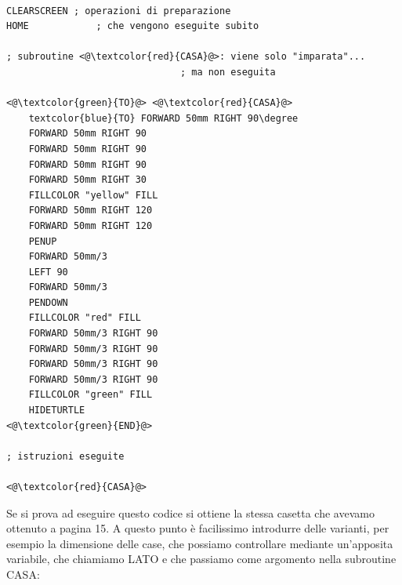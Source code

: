\lstset{extendedchars=true, basicstyle=\scriptsize}
\begin{lstlisting}[frame=single]  % Start your code-block

CLEARSCREEN	; operazioni di preparazione
HOME			; che vengono eseguite subito

; subroutine <@\textcolor{red}{CASA}@>: viene solo "imparata"...
                               ; ma non eseguita 

<@\textcolor{green}{TO}@> <@\textcolor{red}{CASA}@>
	textcolor{blue}{TO} FORWARD 50mm RIGHT 90\degree
	FORWARD 50mm RIGHT 90
	FORWARD 50mm RIGHT 90
	FORWARD 50mm RIGHT 90
	FORWARD 50mm RIGHT 30
	FILLCOLOR "yellow" FILL
	FORWARD 50mm RIGHT 120
	FORWARD 50mm RIGHT 120
	PENUP
	FORWARD 50mm/3
	LEFT 90
	FORWARD 50mm/3
	PENDOWN
	FILLCOLOR "red" FILL
	FORWARD 50mm/3 RIGHT 90
	FORWARD 50mm/3 RIGHT 90
	FORWARD 50mm/3 RIGHT 90
	FORWARD 50mm/3 RIGHT 90
	FILLCOLOR "green" FILL
	HIDETURTLE
<@\textcolor{green}{END}@>

; istruzioni eseguite

<@\textcolor{red}{CASA}@>

\end{lstlisting}

\vskip 1cm

Se si prova ad eseguire questo codice si ottiene la stessa casetta che avevamo ottenuto a pagina 15. A questo punto è facilissimo introdurre delle varianti, per esempio la dimensione delle case, che possiamo controllare mediante un'apposita variabile, che chiamiamo LATO e che passiamo come argomento nella subroutine CASA:

\vskip 1cm

